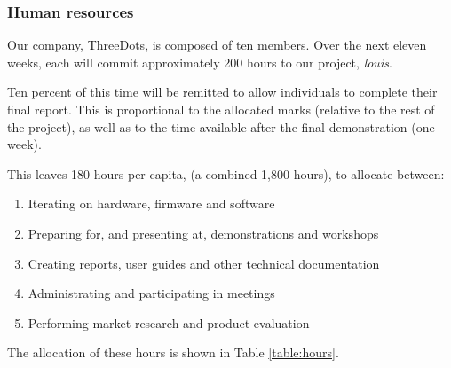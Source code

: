 \documentclass{article}
\begin{document}
\subsubsection{Human resources}

Our company, ThreeDots, is composed of ten members. Over the next eleven weeks, each will commit approximately 200 hours to our project, \emph{louis}.

Ten percent of this time will be remitted to allow individuals to complete their final report. This is proportional to the allocated marks (relative to the rest of the project), as well as to the time available after the final demonstration (one week).

This leaves 180 hours per capita, (a combined 1,800 hours), to allocate between:
\begin{enumerate}
  \item Iterating on hardware, firmware and software
  \item Preparing for, and presenting at, demonstrations and workshops
  \item Creating reports, user guides and other technical documentation
  \item Administrating and participating in meetings
  \item Performing market research and product evaluation
\end{enumerate}

The allocation of these hours is shown in Table \ref{table:hours}.
\end{document}
